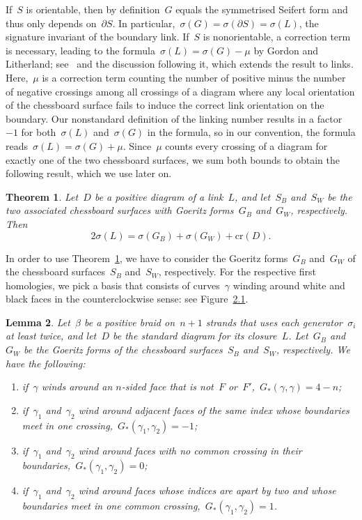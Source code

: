\documentclass[10pt,a4paper]{amsart}
\numberwithin{equation}{section}
\newcommand{\rcr}{\mathrm{cr}}
\newcommand*{\romanenumi}{\renewcommand*{\theenumi}{\roman{enumi}}}
\newtheorem{theo}{Theorem}[section]
\newtheorem{lemm}[theo]{Lemma}
\begin{document}
If~$S$ is orientable, then by definition~$G$ equals the symmetrised Seifert form and thus only depends on~$\partial S$. In particular,~$\sigma(G) = \sigma(\partial S) = \sigma(L)$, the signature invariant of the boundary link. If~$S$ is nonorientable, a correction term is necessary, leading to the formula~$\sigma(L) = \sigma(G) - \mu$ by Gordon and Litherland; see~\cite[Theorem~6]{GL} and the discussion following it, which extends the result to links. Here,~$\mu$ is a correction term counting the number of positive minus the number of negative crossings among all crossings of a diagram where any local orientation of the chessboard surface fails to induce the correct link orientation on the boundary. Our nonstandard definition of the linking number results in a factor~$-1$ for both~$\sigma(L)$ and~$\sigma(G)$ in the formula, so in our convention, the formula reads~$\sigma(L) = \sigma(G) + \mu$. Since~$\mu$ counts every crossing of a diagram for exactly one of the two chessboard surfaces, we sum both bounds to obtain the following result, which we use later on.

\begin{theo}\label{Gordon-Litherland}
Let~$D$ be a positive diagram of a link~$L$, and let~$S_B$ and~$S_W$ be the two associated chessboard surfaces with Goeritz forms~$G_B$ and~$G_W$, respectively. Then
\[
2\sigma(L) = \sigma(G_B) + \sigma(G_W) + \rcr (D).
\]
\end{theo}

In order to use Theorem~\ref{Gordon-Litherland}, we have to consider the Goeritz forms~$G_B$ and~$G_W$ of the chessboard surfaces~$S_B$ and~$S_W$, respectively. For the respective first homologies, we pick a basis that consists of curves~$\gamma$ winding around white and black faces in the counterclockwise sense: see Figure~\href{https://ahl.centre-mersenne.org/item/AHL_2024__7__823_0/}{2.1}.

\begin{lemm}\label{Goer_calc}
Let~$\beta$ be a positive braid on~$n+1$ strands that uses each generator~$\sigma_i$ at least twice, and let~$D$ be the standard diagram for its closure~$L$. Let~$G_B$ and~$G_W$ be the Goeritz forms of the chessboard surfaces~$S_B$ and~$S_W$, respectively. We have the following:
\begin{enumerate}\romanenumi
\item\label{lemm2.2.1} if~$\gamma$ winds around an $n$-sided face that is not~$F$ or~$F'$,~$G_\ast(\gamma,\gamma) = 4-n$;
\item\label{lemm2.2.2} if~$\gamma_1$ and~$\gamma_2$ wind around adjacent faces of the same index whose boundaries meet in one crossing,~$G_\ast(\gamma_1, \gamma_2) = -1$;
\item \label{lemm2.2.3} if~$\gamma_1$ and~$\gamma_2$ wind around faces with no common crossing in their boundaries,~$G_\ast(\gamma_1, \gamma_2) = 0$;
\item\label{lemm2.2.4} if~$\gamma_1$ and~$\gamma_2$ wind around faces whose indices are apart by two and whose boundaries meet in one common crossing,~$G_\ast(\gamma_1, \gamma_2) = 1$.
\end{enumerate}
\end{lemm}
\end{document}
